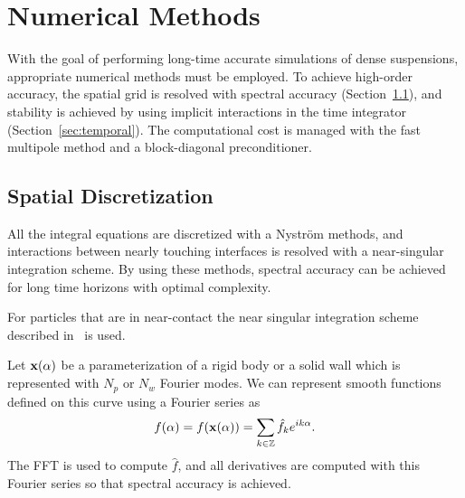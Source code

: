 \documentclass[preprint, 10pt]{elsarticle}
\begin{document}
		
\section{Numerical Methods\label{s:method}} 

With the goal of performing long-time accurate simulations of dense
suspensions, appropriate numerical methods must be employed.  To achieve
high-order accuracy, the spatial grid is resolved with spectral accuracy
(Section~\ref{sec:spatial}), and stability is achieved by using implicit
interactions in the time integrator (Section~\ref{sec:temporal}). The computational cost is managed with the fast multipole method 
\cite{Greenbaum1992} and a
block-diagonal preconditioner.


\subsection{Spatial Discretization}\label{sec:spatial}

All the integral equations are discretized
with a Nystr\"om  methods, and interactions between nearly touching
interfaces is resolved with a near-singular integration scheme. By using
these methods, spectral accuracy can be achieved for long time horizons
with optimal complexity.

For particles that are in near-contact the near singular
integration scheme described in~\cite{Quaife2014, Ying2006} is used.

Let ${\mathbf{x}}(\alpha)$ be a parameterization of a rigid body or a solid
wall which is represented with $N_p$ or $N_w$ Fourier modes. We can represent
smooth functions defined on this curve using a
Fourier series as
\begin{align}
  f(\alpha) = f({\mathbf{x}}(\alpha)) = \sum_{k \in {\mathbb{Z}}} \hat{f}_k e^{ik\alpha}.
\end{align}
The FFT is used to compute $\hat{f}$, and all derivatives are computed
with this Fourier series so that spectral accuracy is achieved.
\end{document}
